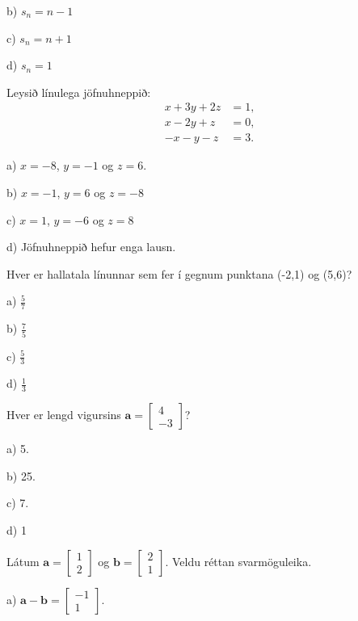 b) $s_n = n-1$

c) $s_n = n+1$

d) $s_n = 1$

\newpage 

\item Leysið línulega jöfnuhneppið:
\begin{align*}
x + 3y + 2z &= 1, \\
x - 2y + z &= 0, \\
-x - y - z &= 3.
\end{align*}

a) $x = -8$, $y = -1$ og $z = 6$.

b) $x = -1$, $y = 6$ og $z = -8$

c) $x = 1$, $y = -6$ og $z = 8$

d) Jöfnuhneppið hefur enga lausn.

\item Hver er hallatala línunnar sem fer í gegnum punktana (-2,1) og (5,6)?

a) \hspace{2mm} $\displaystyle\frac{5}{7}$

b) \hspace{2mm} $\displaystyle\frac{7}{5}$

c) \hspace{2mm} $\displaystyle\frac{5}{3}$

d) \hspace{2mm} $\displaystyle\frac{1}{3}$

\item Hver er lengd vigursins $ \mathbf{a} =
\left[ 
\begin{matrix} 
4\\ 
-3 
\end{matrix} 
\right]$?

a) 5.

b) 25.

c) 7.

d) 1

\item Látum $ \mathbf{a} = 
\left[ 
\begin{matrix} 
1\\ 
2 
\end{matrix} 
\right] 
$  
og 
$ 
\mathbf{b} = 
\left[ 
\begin{matrix} 
2\\ 
1 
\end{matrix} 
\right] 
$. 
Veldu réttan svarmöguleika. 
 
a) $ \mathbf{a} - \mathbf{b} = \left[  \begin{matrix} -1\\ 1 \end{matrix} \right] $.
 
